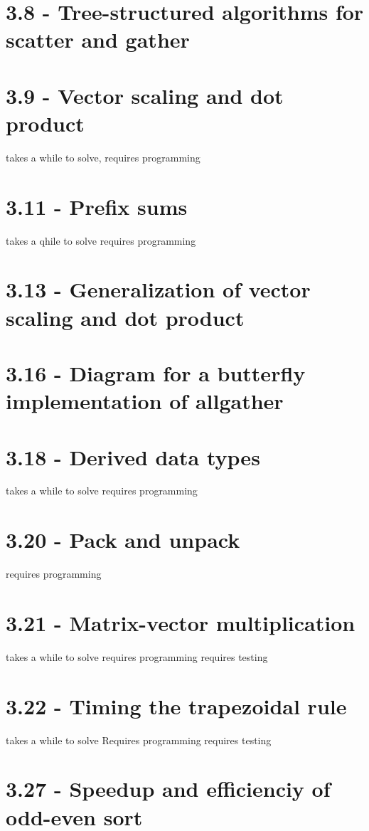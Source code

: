 \documentclass[a4paper,11pt,twoside]{article}
\begin{document}
\section{3.8 - Tree-structured algorithms for scatter and gather}

\section{3.9 - Vector scaling and dot product}
takes a while to solve,
requires programming

\section{3.11 - Prefix sums}
takes a qhile to solve
requires programming

\section{3.13 - Generalization of vector scaling and dot product}

\section{3.16 - Diagram for a butterfly implementation of allgather}

\section{3.18 - Derived data types}
takes a while to solve
requires programming

\section{3.20 - Pack and unpack}
requires programming


\section{3.21 - Matrix-vector multiplication}
takes a while to solve
requires programming
requires testing

\section{3.22 - Timing the trapezoidal rule}
takes a while to solve
Requires programming
requires testing

\section{3.27 - Speedup and efficienciy of odd-even sort}



\end{document}
